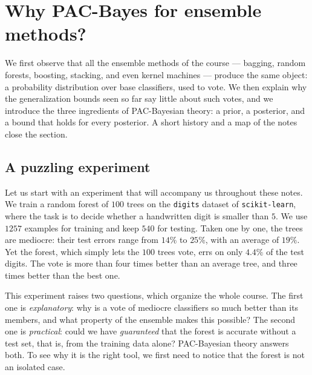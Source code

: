 \section{Why PAC-Bayes for ensemble methods?}
\label{chap:intro}

\begin{objectives}
We first observe that all the ensemble methods of the course --- bagging,
random forests, boosting, stacking, and even kernel machines --- produce the same
object: a probability distribution over base classifiers, used to vote. We then
explain why the generalization bounds seen so far say little about such votes,
and we introduce the three ingredients of PAC-Bayesian theory: a prior, a
posterior, and a bound that holds for every posterior. A short history and a
map of the notes close the section.
\end{objectives}

\subsection{A puzzling experiment}

Let us start with an experiment that will accompany us throughout these notes.
We train a random forest of $100$ trees on the \texttt{digits} dataset of
\texttt{scikit-learn}, where the task is to decide whether a handwritten digit is
smaller than $5$. We use $1257$ examples for training and keep $540$ for testing.
Taken one by one, the trees are mediocre: their test errors range from $14\%$
to $25\%$, with an average of $19\%$. Yet the forest, which simply lets the $100$
trees vote, errs on only $4.4\%$ of the test digits. The vote is more than four
times better than an average tree, and three times better than the best one.

This experiment raises two questions, which organize the whole course. The
first one is \emph{explanatory}: why is a vote of mediocre classifiers so much
better than its members, and what property of the ensemble makes this possible?
The second one is \emph{practical}: could we have \emph{guaranteed} that the
forest is accurate without a test set, that is, from the training data alone?
PAC-Bayesian theory answers both. To see why it is the right tool, we first need
to notice that the forest is not an isolated case.

